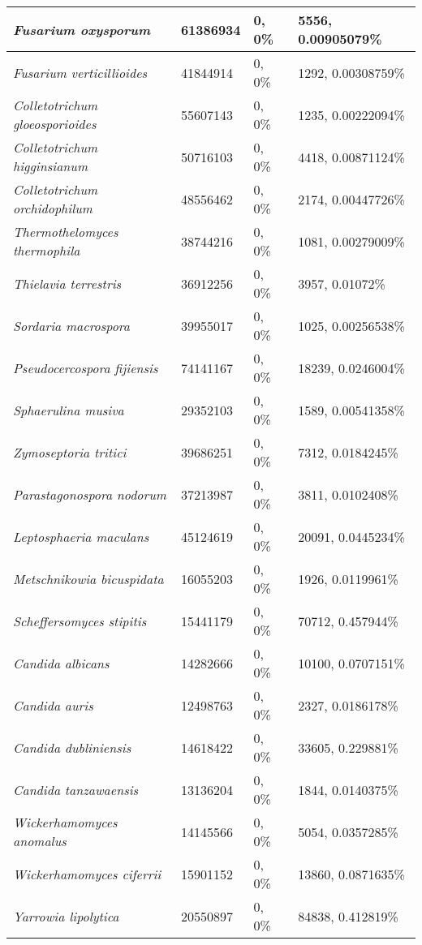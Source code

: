 {\begin{longtable}{| L{4cm} | L{2.7cm}  | L{3.7cm} | L{3.7cm} |}
\textit{Fusarium oxysporum} & 61386934 & 0, 0\% & 5556, 0.00905079\% \\ \hline
\textit{Fusarium verticillioides} & 41844914 & 0, 0\% & 1292, 0.00308759\% \\ \hline
\textit{Colletotrichum gloeosporioides} & 55607143 & 0, 0\% & 1235, 0.00222094\% \\ \hline
\textit{Colletotrichum higginsianum} & 50716103 & 0, 0\% & 4418, 0.00871124\% \\ \hline
\textit{Colletotrichum orchidophilum} & 48556462 & 0, 0\% & 2174, 0.00447726\% \\ \hline
\textit{Thermothelomyces thermophila} & 38744216 & 0, 0\% & 1081, 0.00279009\% \\ \hline
\textit{Thielavia terrestris} & 36912256 & 0, 0\% & 3957, 0.01072\% \\ \hline
\textit{Sordaria macrospora} & 39955017 & 0, 0\% & 1025, 0.00256538\% \\ \hline
\textit{Pseudocercospora fijiensis} & 74141167 & 0, 0\% & 18239, 0.0246004\% \\ \hline
\textit{Sphaerulina musiva} & 29352103 & 0, 0\% & 1589, 0.00541358\% \\ \hline
\textit{Zymoseptoria tritici} & 39686251 & 0, 0\% & 7312, 0.0184245\% \\ \hline
\textit{Parastagonospora nodorum} & 37213987 & 0, 0\% & 3811, 0.0102408\% \\ \hline
\textit{Leptosphaeria maculans} & 45124619 & 0, 0\% & 20091, 0.0445234\% \\ \hline
\textit{Metschnikowia bicuspidata} & 16055203 & 0, 0\% & 1926, 0.0119961\% \\ \hline
\textit{Scheffersomyces stipitis} & 15441179 & 0, 0\% & 70712, 0.457944\% \\ \hline
\textit{Candida albicans} & 14282666 & 0, 0\% & 10100, 0.0707151\% \\ \hline
\textit{Candida auris} & 12498763 & 0, 0\% & 2327, 0.0186178\% \\ \hline
\textit{Candida dubliniensis} & 14618422 & 0, 0\% & 33605, 0.229881\% \\ \hline
\textit{Candida tanzawaensis} & 13136204 & 0, 0\% & 1844, 0.0140375\% \\ \hline
\textit{Wickerhamomyces anomalus} & 14145566 & 0, 0\% & 5054, 0.0357285\% \\ \hline
\textit{Wickerhamomyces ciferrii} & 15901152 & 0, 0\% & 13860, 0.0871635\% \\ \hline
\textit{Yarrowia lipolytica} & 20550897 & 0, 0\% & 84838, 0.412819\% \\ \hline

\end{longtable}}
